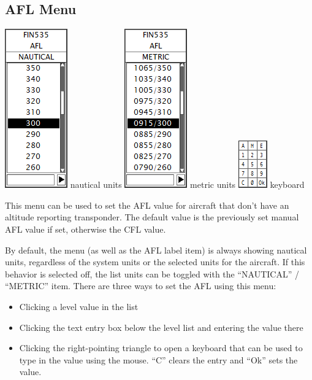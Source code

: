 \documentclass[11pt,a4paper]{memoir}
\begin{document}
\subsection{AFL Menu}
\label{menu:afl}
\includegraphics{img/afl.png}
nautical units
\includegraphics{img/aflm.png}
metric units
\includegraphics{img/kbd.png}
keyboard

This menu can be used to set the AFL value for aircraft that don’t have an altitude reporting transponder.
The default value is the previously set manual AFL value if set, otherwise the CFL value.

By default, the menu (as well as the AFL label item) is always showing nautical units, regardless of the
system units or the selected units for the aircraft. If this behavior is selected off, the list units can be
toggled with the “NAUTICAL” / “METRIC” item. There are three ways to set the AFL using this menu:

\begin{itemize}
        \item Clicking a level value in the list
        \item Clicking the text entry box below the level list and entering the value there
        \item Clicking the right-pointing triangle to open a keyboard that can be used to type in the value using the mouse. “C” clears the entry and “Ok” sets the value.
\end{itemize}
\end{document}
